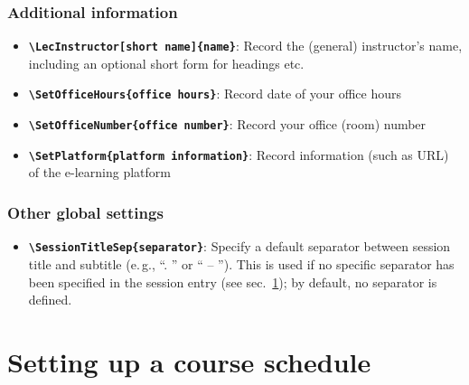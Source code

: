 \documentclass[english]{article}
\newcommand*\jmacro[1]{\textbf{\texttt{#1}}}
\newcommand*\jcsmacro[1]{\jmacro{\textbackslash{#1}}}
\newcommand*\jparam[1]{\angus #1\angud}
\begin{document}
\subsubsection{Additional information}\label{ses-add}
\begin{itemize}
\item \jcsmacro{LecInstructor[\jparam{short name}]\{\jparam{name}\}}: Record the (general) instructor's name, including an optional short form for headings etc.
\item \jcsmacro{SetOfficeHours\{\jparam{office hours}\}}: Record date of your office hours
\item \jcsmacro{SetOfficeNumber\{\jparam{office number}\}}: Record your office (room) number
\item \jcsmacro{SetPlatform\{\jparam{platform information}\}}: Record information
(such as URL) of the e-learning platform
\end{itemize}

\subsubsection{Other global settings}\label{ses-global}
\begin{itemize}
\item \jcsmacro{SessionTitleSep\{\jparam{separator}\}}: Specify a default separator between session title and subtitle (e.\,g., ``. '' or `` -- ''). This is used if no specific separator has been specified in the session entry (see sec.~\ref{sec:lecplan}); by default, no separator is defined.
\end{itemize}

\section{Setting up a course schedule}\label{sec:lecplan}
\end{document}
